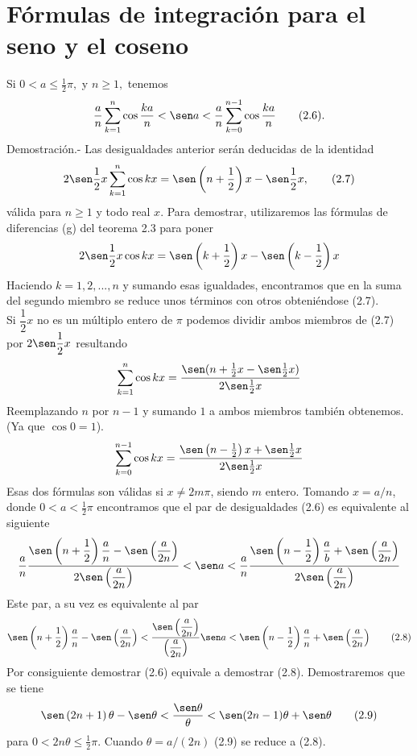 \section{Fórmulas de integración para el seno y el coseno}

\begin{teo} Si $0<a\leq \frac{1}{2}\pi,$ y $n\geq 1,$ tenemos $$\dfrac{a}{n}\sum_{k=1}^n \cos \dfrac{ka}{n}<\sen a < \dfrac{a}{n}\sum_{k=0}^{n-1} \cos \dfrac{ka}{n} \qquad \mbox{(2.6)}.$$
    Demostración.-\; Las desigualdades anterior serán deducidas de la identidad $$2\sen \dfrac{1}{2} x \sum_{k=1}^n \cos kx = \sen\left(n+\dfrac{1}{2}\right)x-\sen \dfrac{1}{2}x, \qquad \mbox{(2.7)}$$
    válida para $n\geq 1$ y todo real $x$. Para demostrar, utilizaremos las fórmulas de diferencias (g) del teorema 2.3 para poner $$2\sen\dfrac{1}{2}x\cos kx = \sen \left(k+\dfrac{1}{2}\right)x - \sen\left(k-\dfrac{1}{2}\right)x$$
    Haciendo $k=1,2,...,n$ y sumando esas igualdades, encontramos que en la suma del segundo miembro se reduce unos términos con otros obteniéndose (2.7).\\
    Si $\dfrac{1}{2}x$ no es un múltiplo entero de $\pi$ podemos dividir ambos miembros de (2.7) por $2\sen \dfrac{1}{2}x$ resultando $$\sum_{k=1}^n \cos kx = \dfrac{\sen(n+\frac{1}{2}x-\sen \frac{1}{2} x)}{2\sen \frac{1}{2}x}$$ 
    Reemplazando $n$ por $n-1$ y sumando $1$ a ambos miembros también obtenemos. (Ya que $\cos 0 = 1$).
    $$\sum_{k=0}^{n-1} \cos kx = \dfrac{\sen\left(n-\frac{1}{2}\right)x + \sen\frac{1}{2}x}{2\sen\frac{1}{2}x}$$
    Esas dos fórmulas son válidas si $x\neq2m\pi$, siendo $m$ entero. Tomando $x=a/n$, donde $0<a<\frac{1}{2}\pi$ encontramos que el par de desigualdades (2.6) es equivalente al siguiente 
    $$\dfrac{a}{n}\dfrac{\sen\left(n+\dfrac{1}{2}\right)\dfrac{a}{n} - \sen \left(\dfrac{a}{2n}\right)}{2\sen\left(\dfrac{a}{2n}\right)} < \sen a < \dfrac{a}{n}\dfrac{\sen\left(n-\dfrac{1}{2}\right)\dfrac{a}{b}+\sen\left(\dfrac{a}{2n}\right)}{2\sen\left(\dfrac{a}{2n}\right)}$$
    Este par, a su vez es equivalente al par
    $$\sen\left(n+\dfrac{1}{2}\right)\dfrac{a}{n}-\sen\left(\dfrac{a}{2n}\right) < \dfrac{\sen\left(\dfrac{a}{2n}\right)}{\left(\dfrac{a}{2n}\right)} \sen a < \sen\left(n-\dfrac{1}{2}\right)\dfrac{a}{n}+\sen\left(\dfrac{a}{2n}\right) \qquad \mbox{(2.8)}$$
    Por consiguiente demostrar (2.6) equivale a demostrar (2.8). Demostraremos que se tiene 
    $$\sen\left(2n+1\right)\theta -\sen \theta < \dfrac{\sen \theta}{\theta} < \sen(2n-1)\theta +\sen \theta \qquad \mbox{(2.9)}$$
    para $0<2n\theta\leq \frac{1}{2}\pi$. Cuando $\theta = a/(2n)$ (2.9) se reduce a (2.8).\\

\end{teo}
